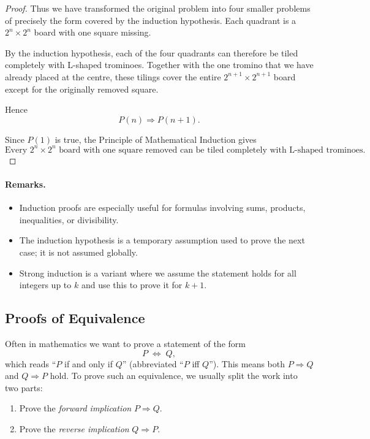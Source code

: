 \begin{proof}
Thus we have transformed the original problem into four smaller
problems of precisely the form covered by the induction hypothesis.
Each quadrant is a $2^n\times2^n$ board with one square missing.

By the induction hypothesis, each of the four quadrants can therefore
be tiled completely with L-shaped trominoes. Together with the one
tromino that we have already placed at the centre, these tilings cover
the entire $2^{n+1}\times2^{n+1}$ board except for the originally
removed square.

Hence
\[
        P(n)\Longrightarrow P(n+1).
\]

Since $P(1)$ is true, the Principle of Mathematical Induction gives
\[
\boxed{
\text{Every $2^n\times2^n$ board with one square removed can be
tiled completely with L-shaped trominoes.}
}
\]
\end{proof}


\paragraph{Remarks.}
\begin{itemize}
  \item Induction proofs are especially useful for formulas involving sums, 
        products, inequalities, or divisibility.
  \item The induction hypothesis is a temporary assumption used to prove the 
        next case; it is not assumed globally.
  \item Strong induction is a variant where we assume the statement holds for 
        all integers up to $k$ and use this to prove it for $k+1$.
\end{itemize}

\subsection{Proofs of Equivalence}

Often in mathematics we want to prove a statement of the form
\[
P \;\Longleftrightarrow\; Q,
\]
which reads ``$P$ if and only if $Q$'' (abbreviated ``$P$ iff $Q$'').
This means both $P \Rightarrow Q$ and $Q \Rightarrow P$ hold. To prove such an
equivalence, we usually split the work into two parts:

\begin{enumerate}
\item Prove the \emph{forward implication} $P \Rightarrow Q$.
\item Prove the \emph{reverse implication} $Q \Rightarrow P$.
\end{enumerate}

